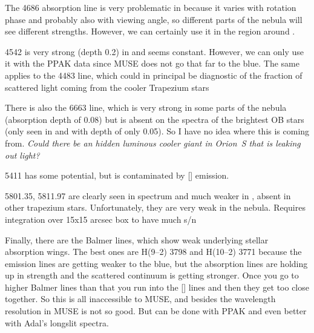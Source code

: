 \documentclass[preprint]{aastex}
\begin{document}
The  4686 absorption line is very problematic in 
because it varies with rotation phase and probably also with viewing
angle, so different parts of the nebula will see different strengths.
However, we can certainly use it in the region around .

 4542 is very strong (depth 0.2) in  and seems
constant.  However, we can only use it with the PPAK data since MUSE
does not go that far to the blue.  The same applies to the 
4483 line, which could in principal be diagnostic of the fraction of
scattered light coming from the cooler Trapezium stars 

There is also the  6663 line, which is very strong in some
parts of the nebula (absorption depth of 0.08) but is absent on the
spectra of the brightest OB stars (only seen in  and with depth
of only 0.05).  So I have no idea where this is coming from.
\textit{Could there be an hidden luminous cooler giant in Orion~S that
is leaking out light?}

 5411 has some potential, but is contaminated by
[] emission. 

 5801.35, 5811.97 are clearly seen in  spectrum and
much weaker in , absent in other trapezium stars.
Unfortunately, they are very weak in the nebula. Requires integration over 15x15 arcsec box to have much s/n

Finally, there are the Balmer lines, which show weak underlying
stellar absorption wings. The best ones are H(9--2) 3798 and H(10--2)
3771 because the emission lines are getting weaker to the blue, but the absorption
lines are holding up in strength and the scattered continuum is
getting stronger.  Once you go to higher Balmer lines than that you
run into the [] lines and then they get too close together.
So this is all inaccessible to MUSE, and besides the wavelength
resolution in MUSE is not so good.  But can be done with PPAK and even
better with Adal's longslit spectra.
\end{document}
